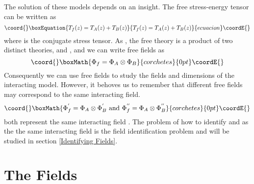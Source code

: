 \documentclass[a4paper,a4paper]{article}
\begin{document}
The solution of these models depends on an insight. The free stress-energy tensor 
\coordHE{} can be written as
\begin{equation}\coord{}\boxEquation{
T_f(z) = T_A(z) + T_B(z)
}{
T_f(z) = T_A(z) + T_B(z)
}{ecuacion}\coordE{}\end{equation}
where \coordHE{} is the conjugate stress tensor. 
As \coordHE{}, the free theory is a product of two 
distinct theories, \coordHE{} and \coordHE{}, and we can write free fields \coordHE{} as
\begin{displaymath}\coord{}\boxMath{
\Phi_f = \Phi_A \otimes \Phi_B
}{corchetes}{0pt}\coordE{}\end{displaymath}
Consequently we can use free fields to study the fields and dimensions of the interacting model.
However, it behoves us to remember that different free fields may correspond to the same
interacting field.
\begin{displaymath}\coord{}\boxMath{
\Phi_f^{'} = \Phi_A \otimes \Phi_B^{'} \textrm{ and } \Phi_f^{''} = \Phi_A \otimes \Phi_B^{''}
}{corchetes}{0pt}\coordE{}\end{displaymath}
both represent the same interacting field \coordHE{}. The problem of how to identify \coordHE{} and 
\coordHE{} as the the same interacting field is the field identification problem and will be
studied in section \ref{Identifying Fields}.

\section{The Fields}
\label{Fields}
\end{document}
